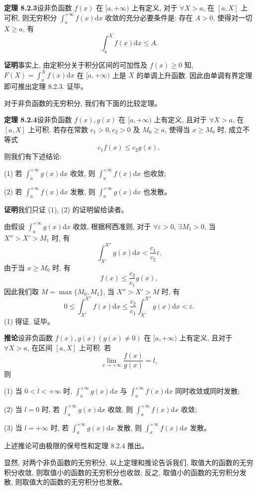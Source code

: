 \documentclass[UTF8,12pt,a4paper,fontset=fandol]{ctexart}
\begin{document}
\noindent\textbf{定理 8.2.3}\quad 设非负函数 $f(x)$ 在 $[a,+\infty)$ 上有定义, 对于 $\forall X>a$, 在 $[a,X]$ 上可积, 则无穷积分 $\int_a^{+\infty}f(x)\mathrm dx$ 收敛的充分必要条件是: 存在 $A>0$, 使得对一切 $X\geq a$, 有
\[
  \int_a^X f(x)\mathrm dx\leq A.
\]

\noindent\textbf{证明}\quad 事实上, 由定积分关于积分区间的可加性及 $f(x)\geq0$ 知, $F(X)=\int_a^X f(x)\mathrm dx$ 在 $[a,+\infty)$ 上是 $X$ 的单调上升函数. 因此由单调有界定理即可推出定理 8.2.3. 证毕。

对于非负函数的无穷积分, 我们有下面的比较定理。

\noindent\textbf{定理 8.2.4}\quad 设非负函数 $f(x),g(x)$ 在 $[a,+\infty)$ 上有定义, 且对于 $\forall X>a$, 在 $[a,X]$ 上可积. 若存在常数 $c_1>0,c_2>0$ 及 $M_0\geq a$, 使得当 $x\geq M_0$ 时, 成立不等式
\[
  c_1f(x)\leq c_2g(x),
\]
则我们有下述结论:

(1) 若 $\int_a^{+\infty}g(x)\mathrm dx$ 收敛, 则 $\int_a^{+\infty}f(x)\mathrm dx$ 也收敛;

(2) 若 $\int_a^{+\infty}f(x)\mathrm dx$ 发散, 则 $\int_a^{+\infty}g(x)\mathrm dx$ 也发散。

\noindent\textbf{证明}\quad 我们只证 (1), (2) 的证明留给读者。

由假设 $\int_a^{+\infty}g(x)\mathrm dx$ 收敛, 根据柯西准则, 对于 $\forall\varepsilon>0$, $\exists M_1>0$, 当 $X''>X'>M_1$ 时, 有
\[
  \int_{X'}^{X''}g(x)\mathrm dx<\frac{c_1}{c_2}\varepsilon.
\]
由于当 $x\geq M_0$ 时, 有
\[
  f(x)\leq \frac{c_2}{c_1}g(x),
\]
因此我们取 $M=\max\{M_0,M_1\}$, 当 $X''>X'>M$ 时, 有
\[
  0\leq \int_{X'}^{X''}f(x)\mathrm dx
  \leq
  \frac{c_2}{c_1}\int_{X'}^{X''}g(x)\mathrm dx<\varepsilon.
\]
(1) 得证. 证毕。

\noindent\textbf{推论}\quad 设非负函数 $f(x),g(x)(g(x)\ne0)$ 在 $[a,+\infty)$ 上有定义, 且对于 $\forall X>a$, 在区间 $[a,X]$ 上可积. 若
\[
  \lim_{x\to+\infty}\frac{f(x)}{g(x)}=l,
\]
则

(1) 当 $0<l<+\infty$ 时, $\int_a^{+\infty}g(x)\mathrm dx$ 与 $\int_a^{+\infty}f(x)\mathrm dx$ 同时收敛或同时发散;

(2) 当 $l=0$ 时, 若 $\int_a^{+\infty}g(x)\mathrm dx$ 收敛, 则 $\int_a^{+\infty}f(x)\mathrm dx$ 收敛;

(3) 当 $l=+\infty$ 时, 若 $\int_a^{+\infty}g(x)\mathrm dx$ 发散, 则 $\int_a^{+\infty}f(x)\mathrm dx$ 发散。

上述推论可由极限的保号性和定理 8.2.4 推出。

显然, 对两个非负函数的无穷积分, 以上定理和推论告诉我们, 取值大的函数的无穷积分收敛, 则取值小的函数的无穷积分也收敛; 反之, 取值小的函数的无穷积分发散, 则取值大的函数的无穷积分也发散。
\end{document}
